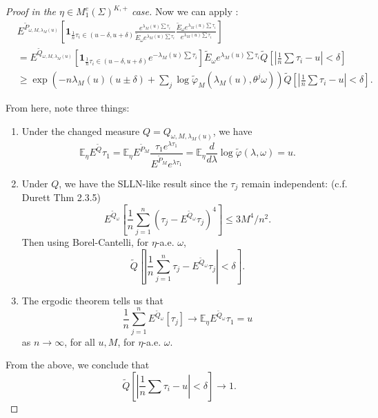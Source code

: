 \begin{proof}[Proof in the $\eta \in M_1^e(\Sigma)^{K, +}$ case]
	Now we can apply :
	\begin{align*}
		&E^{\tilde P_{\omega, M, \lambda_M(u)}}  \left[ 
			\mathbf{1}_{\frac{1}{n} \tau_i \in (u - \delta, u + \delta)}
		\frac{e^{\lambda_M(u) \sum \tau_i}}{\tilde E_\omega e^{\lambda_M(u) \sum \tau_i}} 
		\frac{\tilde E_\omega e^{\lambda_M(u) \sum \tau_i}}{e^{\lambda_M(u) \sum \tau_i}}
	\right] \\
	&= E^{\tilde Q_{\omega, M, \lambda_M(u)}} 
	\left[ \mathbf{1}_{\frac{1}{n} \tau_i \in (u - \delta, u + \delta)} e^{-\lambda_M(u) \sum \tau_i} \right] \tilde E_\omega e^{\lambda_M(u) \sum \tau_i} \tilde Q \left[ \left| \frac{1}{n} \sum \tau_i - u \right| < \delta \right] \\
	&\ge \exp \left( - n \lambda_M(u) (u \pm \delta) + \sum_j \log \tilde \varphi_M(\lambda_M(u), \theta^j \omega) \right) 
	\tilde Q \left[ \left| \frac{1}{n} \sum \tau_i - u \right| < \delta \right] 
	.\end{align*}

	From here, note three things:
	\begin{enumerate}
		\item Under the changed measure $Q = Q_{\omega, M, \lambda_M(u)}$, we have
			\[
				\mathbb{E}_ \eta E^{\tilde Q} \tau_1 = \mathbb{E}_ \eta E^{\tilde P_M} \frac{\tau_1 e^{\lambda \tau_1}}{E^{\tilde P_M} e^{\lambda \tau_1}} = \mathbb{E}_ \eta \frac{d }{d \lambda} \log \tilde \varphi (\lambda, \omega) = u
			.\] 
		\item Under $Q$, we have the SLLN-like result since the $\tau_j$ remain independent: (c.f. Durett Thm 2.3.5)
			\[
				E^{\tilde Q_\omega}  \left[ \frac{1}{n} \sum_{j=1}^{n} \left(\tau_j - E^{\tilde Q_\omega}\tau_j \right)^4 \right]  \le 3 M^4 / n^2
			.\] 
		Then using Borel-Cantelli, for $\eta$-a.e. $\omega$, 
		\[
			\tilde Q \left[ \left| \frac{1}{n} \sum_{j = 1}^n \tau_j - E^{\tilde Q_\omega} \tau_j \right| < \delta \right]
		.\] 
		\item The ergodic theorem tells us that
			\[
				\frac{1}{n} \sum_{j = 1}^n E^{\tilde Q_\omega} \left[ \tau_j \right] \to \mathbb{E}_ \eta E^{\tilde Q_\omega} \tau_1 = u
	\] 
	as $n \to \infty $, for all $u, M$, for $\eta$-a.e. $\omega$.
	\end{enumerate}
	From the above, we conclude that
	\[
		\tilde Q \left[ \left| \frac{1}{n} \sum \tau_i - u \right| < \delta \right] \to 1
	.\] 


\end{proof}

